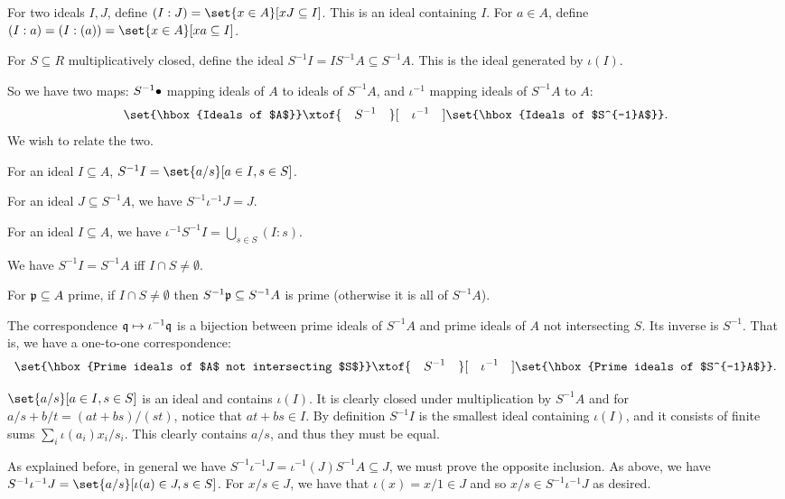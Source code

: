    For two ideals $I,J$, define $(I:J)=\set{x\in A}[xJ\subseteq I]$.
    This is an ideal containing $I$.
    For $a\in A$, define $(I:a)=(I:(a))=\set{x\in A}[xa\subseteq I]$.

    For $S\subseteq R$ multiplicatively closed, define the ideal $S^{-1}I=IS^{-1}A\subseteq S^{-1}A$.
    This is the ideal generated by $\iota(I)$.

\edefn

So we have two maps: $S^{-1}\bullet$ mapping ideals of $A$ to ideals of $S^{-1}A$, and $\iota^{-1}$ mapping ideals of $S^{-1}A$ to $A$:
$$ \set{\hbox{Ideals of $A$}} \xtof{\quad S^{-1}\quad}[\quad\iota^{-1}\quad] \set{\hbox{Ideals of $S^{-1}A$}} . $$
We wish to relate the two.

\bprop

    \benum
        \item For an ideal $I\subseteq A$, $S^{-1}I=\set{a/s}[a\in I,s\in S]$.
        \item For an ideal $J\subseteq S^{-1}A$, we have $S^{-1}\iota^{-1}J=J$.
        \item For an ideal $I\subseteq A$, we have $\iota^{-1}S^{-1}I=\bigcup_{s\in S}(I:s)$.
        \item We have $S^{-1}I=S^{-1}A$ iff $I\cap S\neq\emptyset$.
        \item For ${{\frak p}}\subseteq A$ prime, if $I\cap S\neq\emptyset$ then $S^{-1}{{\frak p}}\subseteq S^{-1}A$ is prime (otherwise it is all of $S^{-1}A$).
        \item The correspondence ${{\frak q}}\mapsto\iota^{-1}{{\frak q}}$ is a bijection between prime ideals of $S^{-1}A$ and prime ideals of $A$ not intersecting $S$.
        Its inverse is $S^{-1}$.
        That is, we have a one-to-one correspondence:
        $$ \set{\hbox{Prime ideals of $A$ not intersecting $S$}} \xtof{\quad S^{-1}\quad}[\quad\iota^{-1}\quad] \set{\hbox{Prime ideals of $S^{-1}A$}} . $$
    \eenum

\eprop

\bproof

    \benum
        \item $\set{a/s}[a\in I,s\in S]$ is an ideal and contains $\iota(I)$.
        It is clearly closed under multiplication by $S^{-1}A$ and for $a/s+b/t=(at+bs)/(st)$, notice that $at+bs\in I$.
        By definition $S^{-1}I$ is the smallest ideal containing $\iota(I)$, and it consists of finite sums $\sum_i\iota(a_i)x_i/s_i$.
        This clearly contains $a/s$, and thus they must be equal.

        \item As explained before, in general we have $S^{-1}\iota^{-1}J=\iota^{-1}(J)S^{-1}A\subseteq J$, we must prove the opposite inclusion.
        As above, we have $S^{-1}\iota^{-1}J=\set{a/s}[\iota(a)\in J,s\in S]$.
        For $x/s\in J$, we have that $\iota(x)=x/1\in J$ and so $x/s\in S^{-1}\iota^{-1}J$ as desired.

